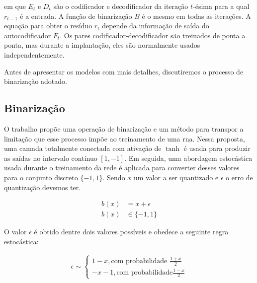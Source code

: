 \noindent em que $E_t$ e $D_t$ são o codificador e decodificador da iteração $t$-ésima para a qual $ r_{t-1}$ é a entrada. A função de binarização $B$ é o mesmo em todas as iterações. A equação para obter o resíduo $r_t$ depende da informação de saída do autocodificador $F_t$.  Os pares codificador-decodificador são treinados de ponta a ponta, mas durante a implantação, eles são normalmente usados independentemente.

Antes de apresentar os modelos com mais detalhes, discutiremos o processo de binarização adotado.


\subsection{Binarização}
\label{subsec:bin}



O trabalho \cite{Variable2016Toderici} propõe uma operação de binarização e um método para transpor a limitação que esse processo impõe ao treinamento de uma \acrshort{rna}. 
Nessa proposta, uma camada totalmente conectada com ativação de $\tanh$ é usada para produzir as saídas no intervalo contínuo $[1,-1]$. Em seguida, uma abordagem estocástica usada durante o treinamento da rede é aplicada para converter desses valores para o conjunto discreto $\{- 1, 1\}$. Sendo $x$ um valor a ser quantizado e $\epsilon$ o erro de quantização devemos ter.

\begin{equation}
\begin{aligned}
b(x) &= x + \epsilon  \\
b(x) & \in \{-1, 1\}
\end{aligned}
\end{equation}

O valor $\epsilon$ é obtido dentre dois valores possíveis e obedece a seguinte regra estocástica:

\begin{equation}
\label{eq:quant2}
\begin{aligned}
\epsilon \sim \left\{
\begin{array}{ll}
1 - x, \text{com probabilidade } \frac{1 + x}{2} \\
-x - 1, \text{com probabilidade} \frac{1 - x}{2}
\end{array}
\right. \\
\end{aligned}
\end{equation}

